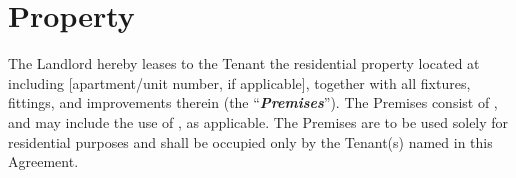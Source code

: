 
\section{Property}
\label{sec:property}

The Landlord hereby leases to the Tenant the residential property located at \LeaseLocationAddress{} including [apartment/unit number, if applicable], together with all fixtures, fittings, and improvements therein (the “\textit{\textbf{Premises}}”). The Premises consist of \LeasedPremiseDescription{}, and may include the use of \LeasedPremiseAmenities{}, as applicable. The Premises are to be used solely for residential purposes and shall be occupied only by the Tenant(s) named in this Agreement. 

